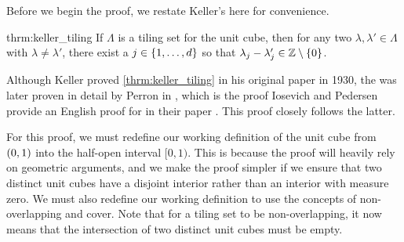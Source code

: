 \documentclass[../thesis.tex]{subfiles}
\begin{document}
Before we begin the proof, we restate Keller's  here for convenience. 
\begin{reptheorem}{thrm:keller_tiling}
    If $\Lambda$ is a tiling set for the unit cube, then for any two $\lambda, \lambda' \in \Lambda$ with $\lambda\neq\lambda'$, there exist a $j\in \{1,\dots,d\}$ so that $\lambda_j-\lambda_j' \in \mathbb{Z}\setminus\{0\}$.
\end{reptheorem}
Although Keller proved \cref{thrm:keller_tiling} in his original paper \cite{kellerUberLuckenloseErfullung1930} in 1930, the  was later proven in detail by Perron in \cite{perronUeberLueckenloseAusfuellung1940}, which is the proof Iosevich and Pedersen provide an English proof for in their paper \cite{iosevichSpectralTilingProperties1998}. This proof closely follows the latter.

For this proof, we must redefine our working definition of the unit cube from $(0,1)$ into the half-open interval $[0,1)$. This is because the proof will heavily rely on geometric arguments, and we make the proof simpler if we ensure that two distinct unit cubes have a disjoint interior rather than an interior with measure zero. We must also redefine our working definition to use the concepts of non-overlapping and cover. Note that for a tiling set to be non-overlapping, it now means that the intersection of two distinct unit cubes must be empty.

\end{document}
